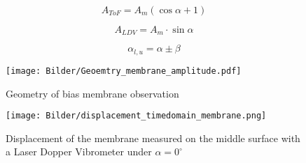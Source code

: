 \begin{equation}
A_{ToF} = A_m (\cos \alpha +1)
\label{eq:tof_amplitude}
\end{equation}

\begin{equation}
A_{LDV} = A_m \cdot \sin \alpha 
\label{eq:ldv_amplitude}
\end{equation}
 
\begin{equation}
\alpha_{l,u} = \alpha \pm \beta
\label{eq:alu_angle}
\end{equation}
\newpage

\begin{figure}[!h]
	\centering
	\texttt{[image: Bilder/Geoemtry\_membrane\_amplitude.pdf]}
	\caption{Geometry of bias membrane observation}
	\label{fig:membrane_geometry}
\end{figure} 

\bigskip
\begin{figure}[!h]
	\centering
	\texttt{[image: Bilder/displacement\_timedomain\_membrane.png]}
	\caption{Displacement of the membrane measured on the middle surface with a Laser Dopper Vibrometer under $\alpha = 0^\circ$}
	\label{fig:displacement_timedomain_membrane}
\end{figure} 

\newpage


